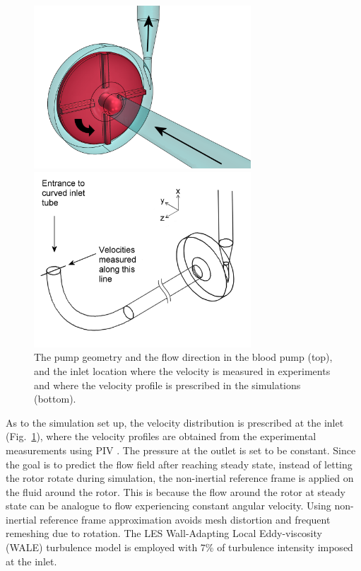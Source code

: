 \begin{figure}[htbp]
    \centering
    \begin{minipage}[c][2.5in][c]{0.9\linewidth}
        \centering
        \includegraphics[width=3.2in]{imgs/nozzle_pump/housing_and_rotor.png}
    \end{minipage}
    \begin{minipage}[c][2.5in][c]{0.9\linewidth}
        \centering
        \includegraphics[width=3.2in]{imgs/nozzle_pump/inlet_velcocity_profile_location.png}
    \end{minipage}
    \caption{The pump geometry and the flow direction in the blood pump (top), and the inlet location where the velocity is measured in experiments and where the velocity profile is prescribed in the simulations (bottom).}
    \label{fig:pumpgeo}
\end{figure}

As to the simulation set up, the velocity distribution is prescribed at the inlet (Fig.~\ref{fig:pumpgeo}), where the velocity profiles are obtained from the experimental measurements using PIV \cite{cpi}. The pressure at the outlet is set to be constant. Since the goal is to predict the flow field after reaching steady state, instead of letting the rotor rotate during simulation, the non-inertial reference frame is applied on the fluid around the rotor. This is because the flow around the rotor at steady state can be analogue to flow experiencing constant angular velocity. Using non-inertial reference frame approximation avoids mesh distortion and frequent remeshing due to rotation. The LES Wall-Adapting Local Eddy-viscosity (WALE) turbulence model is employed with $7$\% of turbulence intensity imposed at the inlet. 

